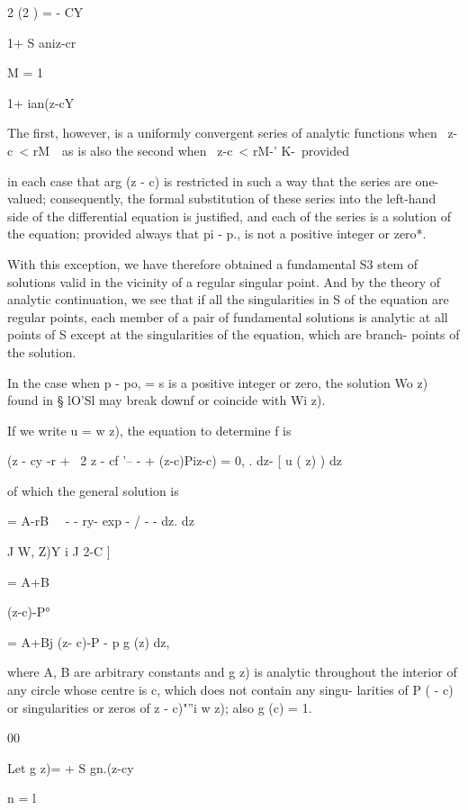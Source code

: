  2 (2 ) = - CY

1+ S aniz-cr

M = 1

1+ ian(z-cY

The first, however, is a uniformly convergent series of analytic
functions when \ z-c\ < rM~\ as is also the second when \ z-c\ < rM-'
K-\ provided

%
%

in each case that arg (z - c) is restricted in such a way that the
series are one-valued; consequently, the formal substitution of these
series into the left-hand side of the differential equation is
justified, and each of the series is a solution of the equation;
provided always that pi - p., is not a positive integer or zero*.

With this exception, we have therefore obtained a fundamental S3 stem
of solutions valid in the vicinity of a regular singular point. And by
the theory of analytic continuation, we see that if all the
singularities in S of the equation are regular points, each member of
a pair of fundamental solutions is analytic at all points of S except
at the singularities of the equation, which are branch- points of the
solution.


In the case when p - po, = s is a positive integer or zero, the
solution Wo z) found in § lO'Sl may break downf or coincide with Wi
z).

If we write u = w z), the equation to determine f is

(z - cy -r + \ 2 z - cf '-- - + (z-c)Piz-c) = 0, . dz- [ u ( z) ) dz

of which the general solution is

 = A-rB\ ~ - - ry- exp - / - - dz. dz

J W, Z)Y i J 2-C ]

= A+B

(z-c)-P°

= A+Bj (z- c)-P - p g (z) dz,

where A, B are arbitrary constants and g z) is analytic throughout the
interior of any circle whose centre is c, which does not contain any
singu- larities of P ( - c) or singularities or zeros of z - c)"''i w
z); also g (c) = 1.

00

Let g z)= + S gn.(z-cy\

n = l

